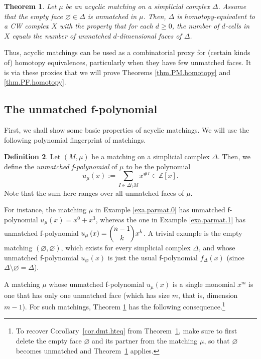 \documentclass[12pt]{amsart}
\newtheorem{theorem}{Theorem}[section]
\theoremstyle{definition}
\newtheorem{definition}[theorem]{Definition}
\begin{document}
\begin{theorem}
\label{thm.dmt.cw}
Let $\mu$ be an acyclic matching on a simplicial complex $\Delta$.
Assume that the empty face $\varnothing \in \Delta$ is unmatched in $\mu$.
Then, $\Delta$ is homotopy-equivalent to a CW complex $X$ with the property
that for each $d \geq 0$, the number of $d$-cells in $X$ equals the number
of unmatched $d$-dimensional faces of $\Delta$.
\end{theorem}

Thus, acyclic matchings can be used as a combinatorial proxy for (certain
kinds of) homotopy equivalences, particularly when they have few unmatched
faces. It is via these proxies that we will prove Theorems
\ref{thm.PM.homotopy} and \ref{thm.PF.homotopy}.

\subsection{The unmatched f-polynomial}

First, we shall show some basic properties of acyclic matchings. We will use
the following polynomial fingerprint of matchings.

\begin{definition}
Let $\left(  M,\mu\right)  $ be a matching on a simplicial complex $\Delta$.
Then, we define the \emph{unmatched f-polynomial} of $\mu$ to be the
polynomial
\[
u_{\mu}\left(  x\right)
:= \sum_{I\in\Delta\setminus M}x^{\#I}
\in \mathbb{Z}\left[  x\right]  .
\]
Note that the sum here ranges over all unmatched faces of $\mu$.
\end{definition}

For instance, the matching $\mu$ in Example \ref{exa.parmat.0} has unmatched
f-polynomial $u_{\mu}\left(  x\right)  =x^{0}+x^{3}$, whereas the one in
Example \ref{exa.parmat.1} has unmatched f-polynomial $u_{\mu}\left(
x\right)  =\dbinom{n-1}{k}x^{k}$. A trivial example is the empty matching
$\left(  \varnothing,\varnothing\right)  $, which exists for every simplicial
complex $\Delta$, and whose unmatched f-polynomial $u_{\varnothing}\left(
x\right)  $ is just the usual f-polynomial $f_{\Delta}\left(  x\right)  $
(since $\Delta\setminus\varnothing=\Delta$).

A matching $\mu$ whose unmatched f-polynomial $u_{\mu}\left(  x\right)  $ is a
single monomial $x^{m}$ is one that has only one unmatched face (which has
size $m$, that is, dimension $m-1$). For such matchings, Theorem
\ref{thm.dmt.cw} has the following consequence.\footnote{To recover
Corollary~\ref{cor.dmt.hteq} from Theorem~\ref{thm.dmt.cw}, make sure to
first delete the empty face $\varnothing$ and its partner from the matching
$\mu$, so that $\varnothing$ becomes unmatched and Theorem~\ref{thm.dmt.cw}
applies.}
\end{document}
